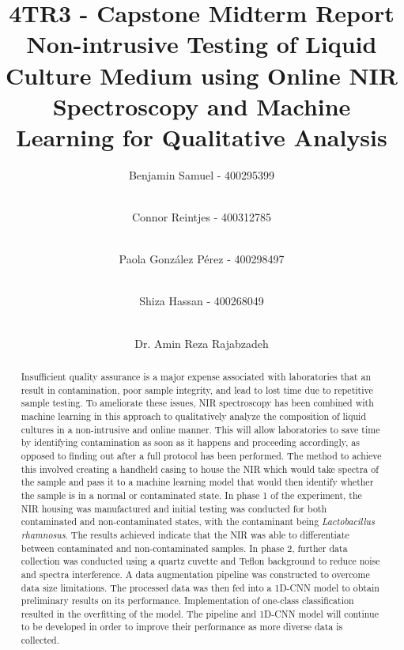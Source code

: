 \documentclass[final, 3p, 11pt]{elsarticle}
\begin{document}
\begin{frontmatter}


\title{4TR3 - Capstone Midterm Report\\}
\title{Non-intrusive Testing of Liquid Culture Medium using Online NIR Spectroscopy and Machine Learning for Qualitative Analysis}

\author[1]{Benjamin Samuel - 400295399 }
\author[1]{\\Connor Reintjes - 400312785 }
\author[1]{\\Paola Gonz\'alez P\'erez - 400298497 }
\author[1]{\\Shiza Hassan - 400268049 }
\author[1]{\\Dr. Amin Reza Rajabzadeh} %



\begin{abstract}
Insufficient quality assurance is a major expense associated with laboratories that an result in contamination, poor sample integrity, and lead to lost time due to repetitive sample testing. To ameliorate these issues, NIR spectroscopy has been combined with machine learning in this approach to qualitatively analyze the composition of liquid cultures in a non-intrusive and online manner. This will allow laboratories to save time by identifying contamination as soon as it happens and proceeding accordingly, as opposed to finding out after a full protocol has been performed. The method to achieve this involved creating a handheld casing to house the NIR which would take spectra of the sample and pass it to a machine learning model that would then identify whether the sample is in a normal or contaminated state. In phase 1 of the experiment, the NIR housing was manufactured and initial testing was conducted for both contaminated and non-contaminated states, with the contaminant being \textit{Lactobacillus rhamnosus}. The results achieved indicate that the NIR was able to differentiate between contaminated and non-contaminated samples. In phase 2, further data collection was conducted using a quartz cuvette and Teflon background to reduce noise and spectra interference. A data augmentation pipeline was constructed to overcome data size limitations. The processed data was then fed into a 1D-CNN model to obtain preliminary results on its performance. Implementation of one-class classification resulted in the overfitting of the model. The pipeline and 1D-CNN model will continue to be developed in order to improve their performance as more diverse data is collected.


\end{abstract}
\end{frontmatter}
\end{document}
